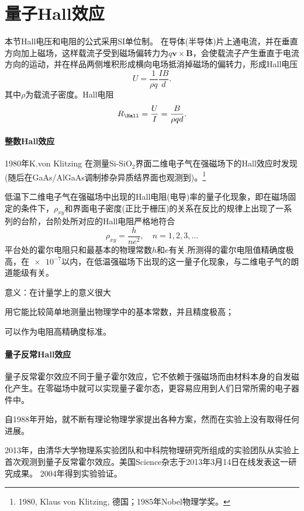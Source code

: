 \section{量子Hall效应}
本节Hall电压和电阻的公式采用SI单位制。
在导体(半导体)片上通电流，并在垂直方向加上磁场，这样载流子受到磁场偏转力为$q\bm v\times\bm B$，会使载流子产生垂直于电流方向的运动，并在样品两侧堆积形成横向电场抵消掉磁场的偏转力，形成Hall电压
\[
U=\frac1{\rho q}\frac{IB}d.
\]
其中$\rho$为载流子密度。Hall电阻
\[
R_\Hall=\frac UI=\frac B{\rho qd}.
\]
\paragraph{整数Hall效应}
1980年K.von Klitzing 在测量Si-SiO$_2$界面二维电子气在强磁场下的Hall效应时发现(随后在GaAs/AlGaAs调制掺杂异质结界面也观测到)。\footnote{1980, Klaus von Klitzing, 德国；1985年Nobel物理学奖。}

低温下二维电子气在强磁场中出现的Hall电阻(电导)率的量子化现象，即在磁场固定的条件下，$\rho_{xy}$和界面电子密度(正比于栅压)的关系在反比的规律上出现了一系列的台阶，台阶处所对应的Hall电阻严格地符合
\[
	\rho_{xy}=\frac h{ne^2},\quad n=1,2,3,\ldots
\]
平台处的霍尔电阻只和最基本的物理常数$h$和$e$有关.所测得的霍尔电阻值精确度极高，在$\num{e-7}$以内，在低温强磁场下出现的这一量子化现象，与二维电子气的朗道能级有关。

意义：在计量学上的意义很大
\begin{compactenum}
	\item 用它能比较简单地测量出物理学中的基本常数，并且精度极高；
	\item 可以作为电阻高精确度标准。
\end{compactenum}
\paragraph{量子反常Hall效应}
量子反常霍尔效应不同于量子霍尔效应，它不依赖于强磁场而由材料本身的自发磁化产生。在零磁场中就可以实现量子霍尔态，更容易应用到人们日常所需的电子器件中。

自1988年开始，就不断有理论物理学家提出各种方案，然而在实验上没有取得任何进展。

2013年，由清华大学物理系实验团队和中科院物理研究所组成的实验团队从实验上首次观测到量子反常霍尔效应。美国Science杂志于2013年3月14日在线发表这一研究成果。
2004年得到实验验证。